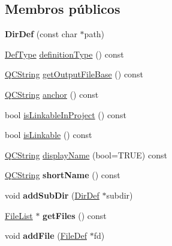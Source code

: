 \subsection*{Membros públicos}
\begin{DoxyCompactItemize}
\item 
\hypertarget{class_dir_def_af059611a05df9f478febc3fe5b792ff0}{{\bfseries Dir\-Def} (const char $\ast$path)}\label{class_dir_def_af059611a05df9f478febc3fe5b792ff0}

\item 
\hyperlink{class_definition_intf_a2dc566dfec40397b2990e6520536ecb5}{Def\-Type} \hyperlink{class_dir_def_aac410235a8bf90e471e649bd9dbf9c5e}{definition\-Type} () const 
\item 
\hyperlink{class_q_c_string}{Q\-C\-String} \hyperlink{class_dir_def_af72a982ba8198cd5c98e9fc850b71df6}{get\-Output\-File\-Base} () const 
\item 
\hyperlink{class_q_c_string}{Q\-C\-String} \hyperlink{class_dir_def_acd17ae1d9600f864b1beb85dfb99a4f4}{anchor} () const 
\item 
bool \hyperlink{class_dir_def_a7ff00a84da6e47f3c64c6bf9f6316385}{is\-Linkable\-In\-Project} () const 
\item 
bool \hyperlink{class_dir_def_afb5645c0dc69c2f1da67da6e33316e3b}{is\-Linkable} () const 
\item 
\hyperlink{class_q_c_string}{Q\-C\-String} \hyperlink{class_dir_def_a67d09f414df966d11bbeba6298307bdf}{display\-Name} (bool=T\-R\-U\-E) const 
\item 
\hypertarget{class_dir_def_a1768aec725e6e8d6824efbc6c7438b12}{\hyperlink{class_q_c_string}{Q\-C\-String} {\bfseries short\-Name} () const }\label{class_dir_def_a1768aec725e6e8d6824efbc6c7438b12}

\item 
\hypertarget{class_dir_def_aaa2e95b878344e83e44008e3d08cbb6a}{void {\bfseries add\-Sub\-Dir} (\hyperlink{class_dir_def}{Dir\-Def} $\ast$subdir)}\label{class_dir_def_aaa2e95b878344e83e44008e3d08cbb6a}

\item 
\hypertarget{class_dir_def_ae8440604622065ec26bb615bbaf1a16e}{\hyperlink{class_file_list}{File\-List} $\ast$ {\bfseries get\-Files} () const }\label{class_dir_def_ae8440604622065ec26bb615bbaf1a16e}

\item 
\hypertarget{class_dir_def_af3efe9b1bf1318fd627ece0d7e8bac04}{void {\bfseries add\-File} (\hyperlink{class_file_def}{File\-Def} $\ast$fd)}\label{class_dir_def_af3efe9b1bf1318fd627ece0d7e8bac04}


\end{DoxyCompactItemize}
